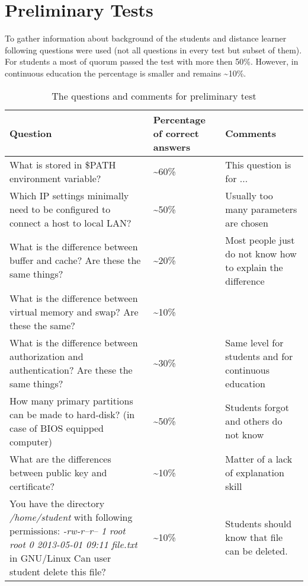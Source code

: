 \chapter{Preliminary Tests}
\label{Preliminary Tests}

To gather information about background of the students and distance learner following questions were used (not all questions in every test but subset of them). For students a most of quorum passed the test with more then 50\%. However, in continuous education the percentage is smaller and remains \textasciitilde 10\%. 

\begin{table}[h]
\centering
\caption{The questions and comments for preliminary test}

\begin{tabular}{|p{7cm}|p{2cm}|p{5cm}|}
\hline 
\color{blue}
Question & \color{blue} Percentage of correct answers & \color{blue} Comments \\ 
\hline 
What is stored in \$PATH environment variable? & \textasciitilde 60\% & This question is for ...\\ 
\hline 
Which IP settings minimally  need to be configured to connect a host to local LAN? & \textasciitilde 50\% & Usually too many  parameters are chosen\\ 
\hline 
What is the difference between buffer and cache? Are these the same things? &\textasciitilde 20\% & Most people just do not know how to explain the difference  \\ 
\hline 
What is the difference between virtual memory and swap? Are these the same? & \textasciitilde 10\%  &   \\ 
\hline 
What is the difference between authorization and authentication? Are these the same things? & \textasciitilde 30\% & Same level for students and  for continuous education \\ 
\hline 
How many primary partitions can be made to hard-disk? (in case of BIOS equipped computer) & \textasciitilde 50\% & Students forgot and others do not know  \\ 
\hline 
What are the differences between public key and certificate?  & \textasciitilde 10\% & Matter of a lack of explanation skill \\ 
\hline 
You have the directory
 \emph{/home/student} with following permissions: 
 \emph{-rw-r--r-- 1 root root 0 2013-05-01 09:11 file.txt}
 in \gls{GNU/Linux} Can user student delete this file? &  \textasciitilde 10\% &Students should know that file can be deleted.  \\ 
\hline 
\end{tabular} 

\label{tab:preliminary_test}
\end{table}

